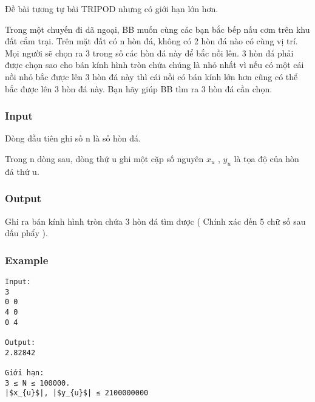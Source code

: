 



   Đề bài tương tự bài TRIPOD nhưng có giới hạn lớn hơn.   


   Trong một chuyến đi dã ngoại, BB muốn cùng các bạn bắc bếp nấu cơm trên khu đất cắm trại. Trên mặt đất có n hòn đá, không có 2 hòn đá nào có cùng vị trí. Mọi người sẽ chọn ra 3 trong số các hòn đá này để bắc nồi lên. 3 hòn đá phải được chọn sao cho bán kính hình tròn chứa chúng là nhỏ nhất vì nếu có một cái nồi nhỏ bắc được lên 3 hòn đá này thì cái nồi có bán kính lớn hơn cũng có thể bắc được lên 3 hòn đá này. Bạn hãy giúp BB tìm ra 3 hòn đá cần chọn.  

\subsubsection{   Input  }

   Dòng đầu tiên ghi số n là số hòn đá.  

   Trong n dòng sau, dòng thứ u ghi một cặp số nguyên $x_{u}$   , $y_{u}$   là tọa độ của hòn đá thứ u.  

\subsubsection{   Output  }

   Ghi ra bán kính hình tròn chứa 3 hòn đá tìm được ( Chính xác đến 5 chữ số sau dấu phẩy ).  

\subsubsection{   Example  }
\begin{verbatim}
Input:
3
0 0
4 0
0 4

Output:
2.82842

Giới hạn:
3 ≤ N ≤ 100000. 
|$x_{u}$|, |$y_{u}$| ≤ 2100000000

\end{verbatim}
